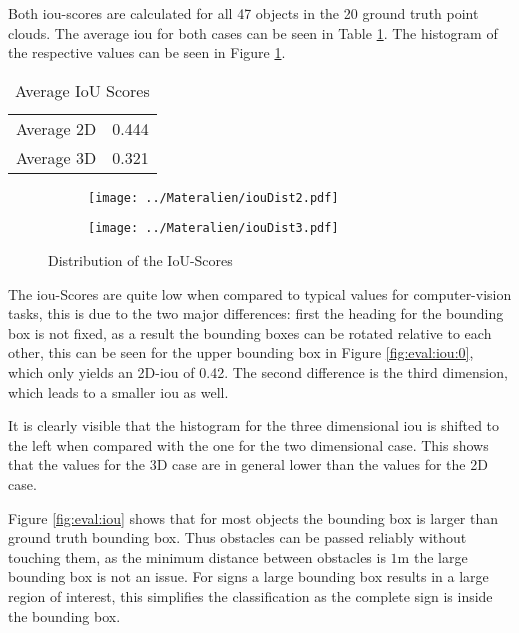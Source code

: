 Both \ac{iou}-scores are calculated for all 47 objects in the 20 ground truth point clouds. 
The average \ac{iou} for both cases can be seen in Table \ref{tab:eval:iou}.
The histogram of the respective values can be seen in Figure \ref{fig:eval:iouDist}.

\begin{table}[h!]
    \centering
    \begin{tabular}{cc}
        \toprule
        Average 2D & 0.444 \\
        Average 3D & 0.321 \\
        \bottomrule
    \end{tabular}
    \caption{Average IoU Scores} 
    \label{tab:eval:iou}
\end{table}

\begin{figure}[h!]
    \centering
    \begin{subfigure}[c]{0.49\textwidth}
        \texttt{[image: ../Materalien/iouDist2.pdf]}
    \end{subfigure}
    \begin{subfigure}[c]{0.49\textwidth}
        \texttt{[image: ../Materalien/iouDist3.pdf]}
    \end{subfigure}
    \caption{Distribution of the IoU-Scores}
    \label{fig:eval:iouDist}
\end{figure}

The \ac{iou}-Scores are quite low when compared to typical values for computer-vision tasks, this is due to the two major differences: first the heading for the bounding box is not fixed, as a result the bounding boxes can be rotated relative to each other, this can be seen for the upper bounding box in Figure \ref{fig:eval:iou:0}, which only yields an 2D-\ac{iou} of 0.42.
The second difference is the third dimension, which leads to a smaller \ac{iou} as well.

It is clearly visible that the histogram for the three dimensional \ac{iou} is shifted to the left when compared with the one for the two dimensional case. This shows that the values for the 3D case are in general lower than the values for the 2D case.

Figure \ref{fig:eval:iou} shows that for most objects the bounding box is larger than ground truth bounding box. Thus obstacles can be passed reliably without touching them, as the minimum distance between obstacles is $1\si{\m}$ \cite{Carolo-CupRegelwerk} the large bounding box is not an issue. For signs a large bounding box results in a large region of interest, this simplifies the classification as the complete sign is inside the bounding box.

